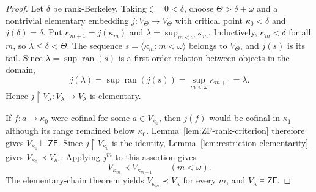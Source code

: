 \documentclass[11pt,a4paper]{amsart}
\newcommand{\ZF}{\mathsf{ZF}}
\newcommand{\restr}{\mathbin{\upharpoonright}}
\theoremstyle{plain}
\theoremstyle{definition}
\theoremstyle{remark}
\begin{document}
\begin{proof}
 Let $\delta$ be rank-Berkeley.  {\color{auditgreen}Taking $\zeta=0<\delta$,} choose $\Theta>\delta+\omega$ and a nontrivial elementary embedding $j:V_\Theta\longrightarrow V_\Theta$ with critical point $\kappa_0<\delta$ and $j(\delta)=\delta$.  Put $\kappa_{m+1}=j(\kappa_m)$ and $\lambda=\sup_{m<\omega}\kappa_m$.  Inductively, $\kappa_m<\delta$ for all $m$, so $\lambda\leq\delta<\Theta$.  The sequence $s=\langle\kappa_m:m<\omega\rangle$ belongs to $V_\Theta$, and $j(s)$ is its tail.  Since $\lambda=\sup\operatorname{ran}(s)$ is a first-order relation between objects in the domain,
\[
j(\lambda)=\sup\operatorname{ran}(j(s))=\sup_{m<\omega}\kappa_{m+1}=\lambda.
\]
Hence $j\restr V_\lambda:V_\lambda\to V_\lambda$ is elementary.

If $f:a\to\kappa_0$ were cofinal for some $a\in V_{\kappa_0}$, then $j(f)$ would be cofinal in $\kappa_1$ although its range remained below $\kappa_0$.  Lemma~\ref{lem:ZF-rank-criterion} therefore gives $V_{\kappa_0}\models\ZF$.  Since $j\restr V_{\kappa_0}$ is the identity, Lemma~\ref{lem:restriction-elementarity} gives $V_{\kappa_0}\prec V_{\kappa_1}$.  Applying $j^m$ to this assertion gives
\[
V_{\kappa_m}\prec V_{\kappa_{m+1}}\qquad(m<\omega).
\]
The elementary-chain theorem yields $V_{\kappa_m}\prec V_\lambda$ for every $m$, and $V_\lambda\models\ZF$.


\end{proof}
\end{document}
